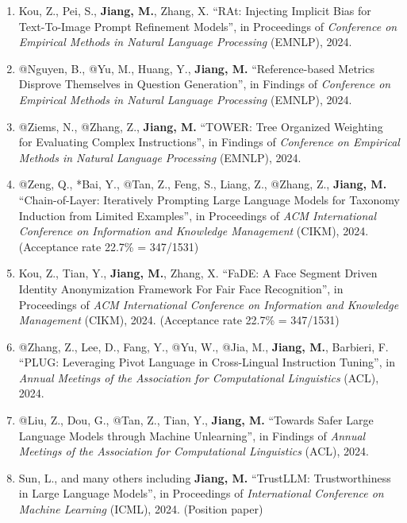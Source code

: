 \documentclass[10pt]{article}
\newenvironment{myindentpar}[1]%
{\begin{list}{}%
         {\setlength{\leftmargin}{#1}}%
         \item[]%
}
{\end{list}}
\newcounter{list}
\begin{document}
\begin{myindentpar}{0.00cm}
\begin{enumerate}[leftmargin=.5cm]
\item[C94] Kou, Z., Pei, S., \textbf{Jiang, M.}, Zhang, X. ``RAt: Injecting Implicit Bias for Text-To-Image Prompt Refinement Models'', in Proceedings of \textit{Conference on Empirical Methods in Natural Language Processing} (EMNLP), 2024.

\item[C93] @Nguyen, B., @Yu, M., Huang, Y., \textbf{Jiang, M.} ``Reference-based Metrics Disprove Themselves in Question Generation'', in Findings of \textit{Conference on Empirical Methods in Natural Language Processing} (EMNLP), 2024.

\item[C92] @Ziems, N., @Zhang, Z., \textbf{Jiang, M.} ``TOWER: Tree Organized Weighting for Evaluating Complex Instructions'', in Findings of \textit{Conference on Empirical Methods in Natural Language Processing} (EMNLP), 2024.

\item[C91] @Zeng, Q., *Bai, Y., @Tan, Z., Feng, S., Liang, Z., @Zhang, Z., \textbf{Jiang, M.} ``Chain-of-Layer: Iteratively Prompting Large Language Models for Taxonomy Induction from Limited Examples'', in Proceedings of \textit{ACM International Conference on Information and Knowledge Management} (CIKM), 2024. (Acceptance rate 22.7\% = 347/1531)

\item[C90] Kou, Z., Tian, Y., \textbf{Jiang, M.}, Zhang, X. ``FaDE: A Face Segment Driven Identity Anonymization Framework For Fair Face Recognition'', in Proceedings of \textit{ACM International Conference on Information and Knowledge Management} (CIKM), 2024. (Acceptance rate 22.7\% = 347/1531)

\item[C89] @Zhang, Z., Lee, D., Fang, Y., @Yu, W., @Jia, M., \textbf{Jiang, M.}, Barbieri, F. ``PLUG: Leveraging Pivot Language in Cross-Lingual Instruction Tuning'', in \textit{Annual Meetings of the Association for Computational Linguistics} (ACL), 2024.

\item[C88] @Liu, Z., Dou, G., @Tan, Z., Tian, Y., \textbf{Jiang, M.} ``Towards Safer Large Language Models through Machine Unlearning'', in Findings of \textit{Annual Meetings of the Association for Computational Linguistics} (ACL), 2024.

\item[C87] Sun, L., and many others including \textbf{Jiang, M.} ``TrustLLM: Trustworthiness in Large Language Models'', in Proceedings of \textit{International Conference on Machine Learning} (ICML), 2024. (Position paper)
		

\end{enumerate}
\end{myindentpar}
\end{document}
